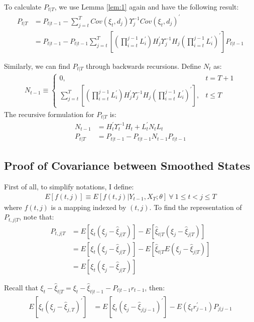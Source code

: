 \documentclass[10pt]{article}
\numberwithin{equation}{section}
\begin{document}
To calculate $P_{t|T}$, we use Lemma \ref{lem:1} again and have the following result:
\begin{align*}
    P_{t|T} &= P_{t|t-1} - \sum_{j=t}^TCov(\xi_t,d_j)\Upsilon_j^{-1}Cov(\xi_t,d_j)^{'} \\
    &=P_{t|t-1} - P_{t|t-1}\sum_{j=t}^{T}\left[\left(\prod_{i=t}^{j-1}L_{i}^{'}\right)H_j^{'}\Upsilon_j^{-1}H_j\left(\prod_{i=t}^{j-1}L_{i}^{'}\right)^{'}\right]P_{t|t-1}
\end{align*}

Similarly, we can find $P_{t|T}$ through backwards recursions. Define $N_t$ as:
\begin{align*}
    N_{t-1} \equiv \begin{cases}
        0, & t=T+1 \\
        \sum_{j=t}^{T}\left[\left(\prod_{i=t}^{j-1}L_{i}^{'}\right)H_j^{'}\Upsilon_j^{-1}H_j\left(\prod_{i=t}^{j-1}L_{i}^{'}\right)^{'}\right], & t\leq T
    \end{cases}
\end{align*}
The recursive formulation for $P_{t|T}$ is:
\begin{align*}
    N_{t-1} &= H_t^{'}\Upsilon_t^{-1}H_t + L_t^{'}N_tL_t \\
    P_{t|T} &= P_{t|t-1}- P_{t|t-1}N_{t-1}P_{t|t-1} 
\end{align*}

\subsection{Proof of Covariance between Smoothed States} \label{ap:cov_smooth}
First of all, to simplify notations, I define: 
\begin{align*}
    E[f(t,j)]\equiv E[f(t,j)|Y_{t-1},X_T;\theta] \  \forall\  1\leq t < j \leq T
\end{align*}
where $f(t,j)$ is a mapping indexed by $(t,j)$. To find the representation of $P_{t,j|T}$, note that:
\begin{align*}
    P_{t,j|T} &= E[\xi_t(\xi_j-\hat{\xi}_{j|T})] - E[\hat{\xi}_{t|T}(\xi_j-\hat{\xi}_{j|T})] \\
     &= E[\xi_t(\xi_j-\hat{\xi}_{j|T})] - E[\hat{\xi}_{t|T}E(\xi_j-\hat{\xi}_{j|T})] \\
     &= E[\xi_t(\xi_j-\hat{\xi}_{j|T})]
\end{align*}

Recall that $\xi_t-\hat{\xi}_{t|T} = \xi_t - \hat{\xi}_{t|t-1} - P_{t|t-1}r_{t-1}$, then:
\begin{align*}
    E[\xi_t(\xi_j-\hat{\xi}_{j,T})^{'}] &= E[\xi_t(\xi_j-\hat{\xi}_{j|j-1})^{'}] - E(\xi_tr_{j-1}^{'})P_{j|j-1}
\end{align*}
\end{document}
